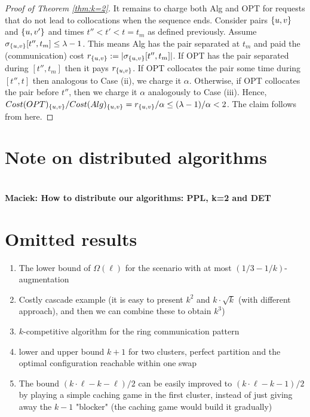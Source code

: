 \documentclass[manuscript,screen=true, review, anonymous]{acmart}
\DeclarePairedDelimiter\set{\{}{\}}
\newcommand\maciek[1]{\color{brown}\textbf{\\ Maciek: #1}\color{black}}
\begin{document}
\begin{proof}[Proof of Theorem \ref{thm:k=2}]
	It remains to charge both Alg and OPT for requests that do not lead to collocations when the sequence ends.
	Consider  pairs $\set{u,v}$ and $\set{u,v'}$ and
	times $t'' < t' < t = t_m$ as defined previously.
	Assume $\sigma_{\set{u,v}}[t'', t_m] \leq \lambda - 1$.
	This means Alg has the pair separated at $t_m$
	and paid the (communication) cost $r_{\set{u,v}} := | \sigma_{\set{u,v}}[t'', t_m]|$.
	If OPT has the pair separated during $[t'',t_m]$ then it pays $r_{\set{u,v}}$.
	If OPT collocates the pair some time during $[t'', t]$ then analogous to Case (ii),
	we charge it $\alpha$.
	Otherwise,
	if OPT collocates the pair before $t''$,
	then we charge it $\alpha$ analogously to Case (iii).
	Hence, 
	$Cost(OPT)_{\set{u,v}} / Cost(Alg)_{\set{u,v}} = r_{\set{u,v}}/ \alpha \leq (\lambda-1) / \alpha < 2$.
	The claim follows from here.
\end{proof}

\section{Note on distributed algorithms}

\maciek{How to distribute our algorithms: PPL, k=2 and DET}


  

\pagebreak
\appendix


\section{Omitted results}

\begin{enumerate}
  		 \item The lower bound of $\Omega(\ell)$ for the scenario with at most $(1/3-1/k)$-augmentation
  
  		 \item Costly cascade example (it is easy to present $k^2$ and $k\cdot \sqrt{k}$ (with different approach), and then we can combine these to obtain $k^3$)
  
  		 \item $k$-competitive algorithm for the ring communication pattern
       
       \item lower and upper bound $k+1$ for two clusters, perfect partition and the optimal configuration reachable within one swap
       \item 
       The bound $(k \cdot \ell - k - \ell) / 2$ can be easily improved to $(k \cdot \ell - k - 1) / 2$ by playing a simple caching game in the first cluster, instead of just giving away the $k-1$ "blocker" (the caching game would build it gradually)
  
  \end{enumerate}
\end{document}
